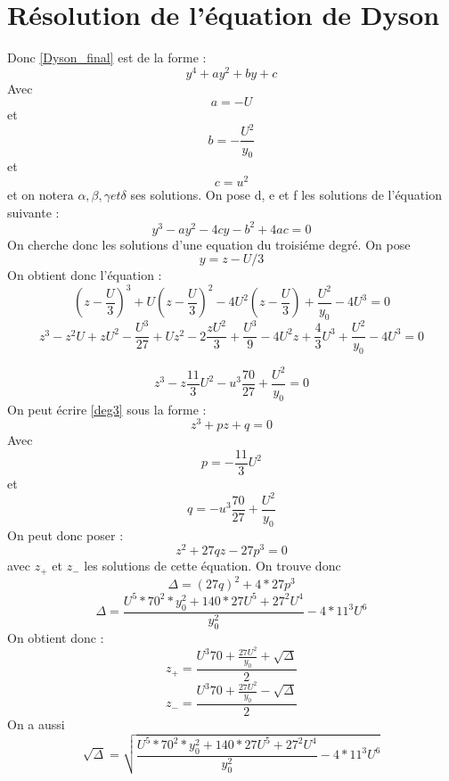 \documentclass[12pt]{article}
\begin{document}
\section{R\'esolution de l'\'equation de Dyson}
Donc \ref{Dyson_final} est de la forme :
\begin{equation}
y^4 + a y^2 + b y + c 
\end{equation}
Avec $$a = -U$$ et $$b = -\frac{U^2}{y_0}$$ et $$c = u^2$$
et on notera $\alpha, \beta, \gamma et \delta$ ses solutions. 
On pose d, e et f les solutions de l'\'equation suivante : 
\begin{equation}
y^3 - a y^2 -4cy - b^2 + 4 ac = 0
\end{equation}
On cherche donc les solutions d'une equation du troisi\'eme degr\'e.
On pose $$y = z - U/3$$
On obtient donc l'\'equation :
\begin{equation}
(z - \frac{U}{3})^3  + U (z - \frac{U}{3})^2 - 4 U ^2(z - \frac{U}{3}) + \frac{U^2}{y_0} - 4U^3 = 0
\end{equation}
\begin{equation}
z^3-z^2U+zU^2 - \frac{U^3}{27}+Uz^2-2\frac{zU^2}{3}+ \frac{U^3}{9} - 4U^2z+\frac{4}{3}U^3+\frac{U^2}{y_0}-4U^3 = 0
\end{equation}

\begin{equation}
\label{deg3}
z^3 - z\frac{11}{3}U^2 - u^3\frac{70}{27}+\frac{U^2}{y_0} = 0 
\end{equation}
On peut \'ecrire \ref{deg3} sous la forme :
\begin{equation}
z^3+pz+q = 0
\end{equation}
Avec $$p = -\frac{11}{3}U^2$$ et $$q = - u^3\frac{70}{27}+\frac{U^2}{y_0} $$
On peut donc poser :
\begin{equation}
z^2+27qz - 27p^3 = 0 
\end{equation}
avec $z_{+}$ et $z_{-}$ les solutions de cette \'equation.
On trouve donc $$\Delta = (27q)^2 + 4*27p^3$$
\begin{equation}
\Delta = \frac{U^5*70^2*y_0^2+ 140*27U^5+27^2U^4}{y_0^2} - 4*11^3U^6 
\end{equation}
On obtient donc :
\begin{equation}
z_+ = \frac{U^3 70 + \frac{27U^2}{y_0} +\sqrt{\Delta}}{2} 
\end{equation}
\begin{equation}
z_- = \frac{U^3 70 + \frac{27U^2}{y_0} -\sqrt{\Delta}}{2}  
\end{equation}
On a aussi
\begin{equation}
 \sqrt{\Delta} = \sqrt{\frac{U^5*70^2*y_0^2+ 140*27U^5+27^2U^4}{y_0^2} - 4*11^3U^6 }
\end{equation}
\end{document}

